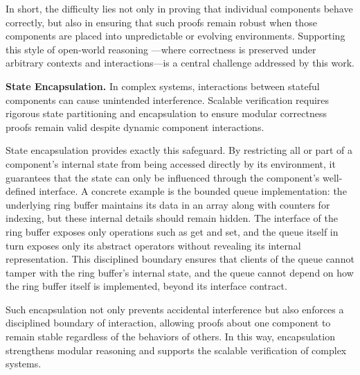 \begin{challenge}
  In short,
  the difficulty lies not only in proving
  that individual components behave correctly,
  but also in ensuring that
  such proofs remain robust
  when those components are placed
  into unpredictable or evolving environments.
  Supporting this style of open-world reasoning%
  ---where correctness is preserved under arbitrary contexts
  and interactions---is a central challenge
  addressed by this work.

\end{challenge}

\begin{challenge}
  \label{challenge:encapsulation}
  \textbf{State Encapsulation.}
  In complex systems,
  interactions between stateful components
  can cause unintended interference.
  Scalable verification requires
  rigorous state partitioning and encapsulation
  to ensure modular correctness proofs remain valid
  despite dynamic component interactions.

  State encapsulation provides exactly this safeguard.
  By restricting all or part of a component's internal state
  from being accessed directly by its environment,
  it guarantees that
  the state can only be influenced
  through the component's well-defined interface.
  A concrete example is the bounded queue implementation:
  the underlying ring buffer maintains its data in an array
  along with counters for indexing,
  but these internal details should remain hidden.
  The interface of the ring buffer exposes only operations
  such as get and set,
  and the queue itself in turn exposes only its abstract operators
  without revealing its internal representation.
  This disciplined boundary ensures that clients of the queue
  cannot tamper with the ring buffer's internal state,
  and the queue cannot depend on how the ring buffer itself is implemented,
  beyond its interface contract.

  Such encapsulation not only prevents accidental interference
  but also enforces a disciplined boundary of interaction,
  allowing proofs about one component
  to remain stable regardless of the behaviors of others.
  In this way,
  encapsulation strengthens modular reasoning
  and supports the scalable verification of complex systems.

\end{challenge}

